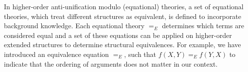 %
%

In higher-order anti-unification modulo (equational) theories, a set of equational theories, which treat different structures as equivalent, is defined to incorporate background knowledge. Each equational theory $=_E$ determines which terms are considered equal and a set of these equations can be applied on higher-order extended structures to determine structural equivalences. For example, we have introduced an equivalence equation $=_E$, such that $f(X,Y) =_E f(Y,X)$ to indicate that the ordering of arguments does not matter in our context.

